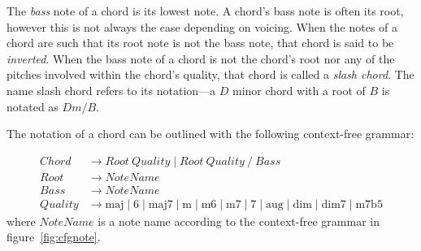The \textit{bass} note of a chord is its lowest note. A chord's bass note is often its root, however this is not always the case depending on voicing. When the notes of a chord are such that its root note is not the bass note, that chord is said to be \textit{inverted}. When the bass note of a chord is not the chord's root nor any of the pitches involved within the chord's quality, that chord is called a \textit{slash chord}. The name slash chord refers to its notation---a $D$ minor chord with a root of $B$ is notated as $Dm/B$.

The notation of a chord can be outlined with the following context-free grammar:

\begin{align*}
Chord &\to Root\ Quality \mid Root\ Quality\ \texttt{/} \ Bass \\
Root &\to NoteName \\
Bass &\to NoteName \\
Quality &\to \text{maj} \mid \text{6} \mid \text{maj7} \mid \text{m} \mid \text{m6} \mid \text{m7} \mid \text{7} \mid \text{aug} \mid \text{dim} \mid \text{dim7} \mid \text{m7b5}
\end{align*}
where $NoteName$ is a note name according to the context-free grammar in figure~\ref{fig:cfgnote}.